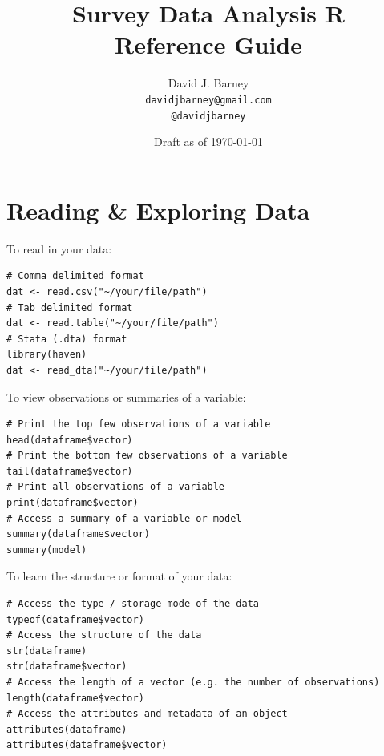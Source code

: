 \documentclass[12pt, letterpaper,notitlepage]{article}
\begin{document}
\title{Survey Data Analysis R \\ Reference Guide}
\author{
  David J. Barney \\
    {\small\texttt{davidjbarney@gmail.com}} \\
      {\small\texttt{@davidjbarney}}
}
\date{Draft as of \today}


\begin{titlingpage}




\maketitle
\doclicenseThis
\end{titlingpage}


\newpage

\tableofcontents

\newpage


\section{Reading \& Exploring Data}


To read in your data:

\begin{lstlisting}
# Comma delimited format
dat <- read.csv("~/your/file/path")
# Tab delimited format
dat <- read.table("~/your/file/path")
# Stata (.dta) format
library(haven)
dat <- read_dta("~/your/file/path")
\end{lstlisting}


To view observations or summaries of a variable:

\begin{lstlisting}
# Print the top few observations of a variable
head(dataframe$vector)
# Print the bottom few observations of a variable
tail(dataframe$vector)
# Print all observations of a variable
print(dataframe$vector)
# Access a summary of a variable or model
summary(dataframe$vector)
summary(model)
\end{lstlisting}

To learn the structure or format of your data:

\begin{lstlisting}
# Access the type / storage mode of the data
typeof(dataframe$vector) 
# Access the structure of the data
str(dataframe) 
str(dataframe$vector) 
# Access the length of a vector (e.g. the number of observations)
length(dataframe$vector)
# Access the attributes and metadata of an object
attributes(dataframe) 
attributes(dataframe$vector) 
\end{lstlisting}
\end{document}
